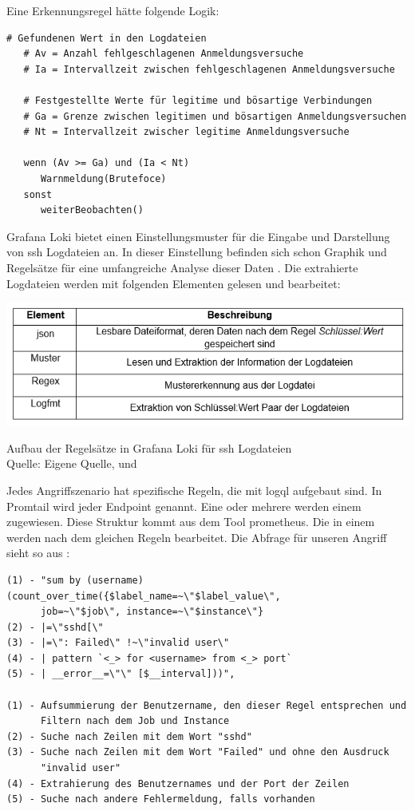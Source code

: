 Eine Erkennungsregel hätte folgende Logik:
{
\begin{Verbatim}[frame=single]
   # Gefundenen Wert in den Logdateien
   # Av = Anzahl fehlgeschlagenen Anmeldungsversuche
   # Ia = Intervallzeit zwischen fehlgeschlagenen Anmeldungsversuche

   # Festgestellte Werte für legitime und bösartige Verbindungen
   # Ga = Grenze zwischen legitimen und bösartigen Anmeldungsversuchen
   # Nt = Intervallzeit zwischer legitime Anmeldungsversuche

   wenn (Av >= Ga) und (Ia < Nt)
      Warnmeldung(Brutefoce)
   sonst
      weiterBeobachten()
\end{Verbatim}
}

\newpage
Grafana Loki bietet einen Einstellungsmuster für die Eingabe und Darstellung von \gls{ssh} Logdateien an. In dieser Einstellung befinden sich schon Graphik und Regelsätze für eine umfangreiche Analyse dieser Daten \citep{VoidQuark_sshlogs}. Die extrahierte Logdateien werden mit folgenden Elementen gelesen und bearbeitet:

\begin{table}[H]
   \includegraphics[width=\linewidth]{assets/tabelle_sshgrafana.png}
   \caption{Aufbau der Regelsätze in Grafana Loki für \gls{ssh} Logdateien \\Quelle: Eigene Quelle, \citep{VoidQuark_sshlogs} und \citep{Setter_Logfmt}}
\end{table}

Jedes Angriffszenario hat spezifische Regeln, die mit \gls{logql}  aufgebaut sind. In Promtail wird jeder \gls{Endpoint}  genannt. Eine oder mehrere  werden einem  zugewiesen. Diese Struktur kommt aus dem Tool \gls{prometheus}. Die  in einem  werden nach dem gleichen Regeln bearbeitet. Die Abfrage für unseren Angriff sieht so aus \citep{VoidQuark_sshlogs}:

{
\begin{Verbatim}[frame=single]
(1) - "sum by (username) (count_over_time({$label_name=~\"$label_value\",
      job=~\"$job\", instance=~\"$instance\"} 
(2) - |=\"sshd[\" 
(3) - |=\": Failed\" !~\"invalid user\" 
(4) - | pattern `<_> for <username> from <_> port` 
(5) - | __error__=\"\" [$__interval]))",

(1) - Aufsummierung der Benutzername, den dieser Regel entsprechen und 
      Filtern nach dem Job und Instance
(2) - Suche nach Zeilen mit dem Wort "sshd"
(3) - Suche nach Zeilen mit dem Wort "Failed" und ohne den Ausdruck 
      "invalid user"
(4) - Extrahierung des Benutzernames und der Port der Zeilen
(5) - Suche nach andere Fehlermeldung, falls vorhanden
\end{Verbatim}
}


